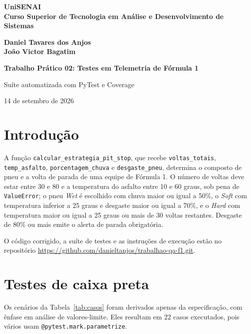 \documentclass[12pt,a4paper]{article}
\begin{document}
\begin{titlepage}
\centering
{\bfseries UniSENAI\\Curso Superior de Tecnologia em Análise e Desenvolvimento de Sistemas\par}
\vspace{6cm}
{\bfseries Daniel Tavares dos Anjos\\João Victor Bagatim\par}
\vfill
{\LARGE\bfseries Trabalho Prático 02: Testes em Telemetria de Fórmula 1\par}
\vspace{0.5cm}
{\large Suíte automatizada com PyTest e Coverage\par}
\vfill
14 de setembro de 2026
\end{titlepage}

\section{Introdução}

A função \texttt{calcular\_estrategia\_pit\_stop}, que recebe \texttt{voltas\_totais},
\texttt{temp\_asfalto}, \texttt{porcentagem\_chuva} e \texttt{desgaste\_pneu}, determina o composto
de pneu e a volta de parada de uma equipe de Fórmula 1.
O número de voltas deve estar entre 30 e 80 e a temperatura do asfalto entre 10 e 60 graus, sob pena
de \texttt{ValueError}; o pneu \emph{Wet} é escolhido com chuva maior ou igual a 50\%, o \emph{Soft}
com temperatura inferior a 25 graus e desgaste maior ou igual a 70\%, e o \emph{Hard} com temperatura
maior ou igual a 25 graus ou mais de 30 voltas restantes. Desgaste de 80\% ou mais emite o alerta de
parada obrigatória.

O código corrigido, a suíte de testes e as instruções de execução estão no repositório
\url{https://github.com/danieltanjos/trabalhao-qa-f1.git}.

\section{Testes de caixa preta}

Os cenários da Tabela~\ref{tab:casos} foram derivados apenas da especificação, com ênfase em análise
de valores-limite. Eles resultam em 22 casos executados, pois vários usam
\texttt{@pytest.mark.parametrize}.
\end{document}

